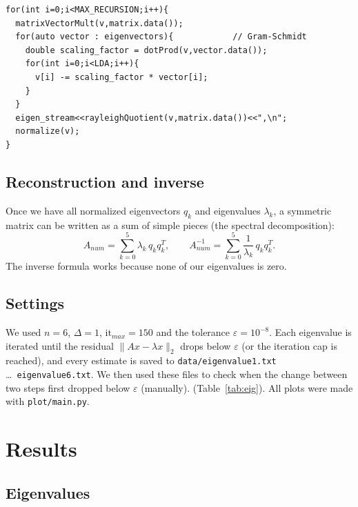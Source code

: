 \documentclass{article}
\begin{document}
\begin{verbatim}
for(int i=0;i<MAX_RECURSION;i++){
  matrixVectorMult(v,matrix.data());
  for(auto vector : eigenvectors){            // Gram-Schmidt
    double scaling_factor = dotProd(v,vector.data());
    for(int i=0;i<LDA;i++){
      v[i] -= scaling_factor * vector[i];
    }
  }
  eigen_stream<<rayleighQuotient(v,matrix.data())<<",\n";
  normalize(v);
}
\end{verbatim}

\subsection{Reconstruction and inverse}
Once we have all normalized eigenvectors $q_k$ and eigenvalues $\lambda_k$, a symmetric matrix can be written
as a sum of simple pieces (the spectral decomposition):
\begin{equation}
    A_{num} = \sum_{k=0}^{5} \lambda_k\, q_k q_k^T, \qquad
    A^{-1}_{num} = \sum_{k=0}^{5} \frac{1}{\lambda_k}\, q_k q_k^T .
\end{equation}
The inverse formula works because none of our eigenvalues is zero.

\subsection{Settings}
We used $n = 6$, $\Delta = 1$, $\mathrm{it}_{max} = 150$ and the tolerance $\varepsilon = 10^{-8}$.
Each eigenvalue is iterated until the residual $\|Ax - \lambda x\|_2$ drops below $\varepsilon$ (or the
iteration cap is reached), and every estimate is saved to \texttt{data/eigenvalue1.txt} \dots\
\texttt{eigenvalue6.txt}.
We then used these files to check when the change between two steps first dropped below $\varepsilon$ (manually).
(Table~\ref{tab:eig}). All plots were made with \texttt{plot/main.py}.

\section{Results}

\subsection{Eigenvalues}
\end{document}
